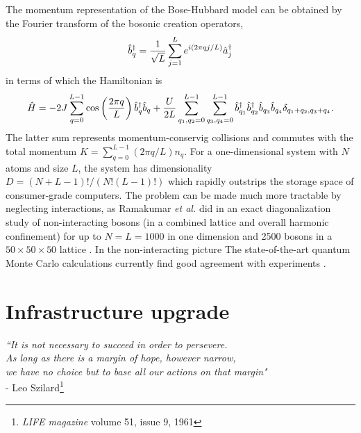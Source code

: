 	The momentum representation of the Bose-Hubbard model can be obtained by the Fourier transform\cite{Zhang10} of the bosonic creation operators,
	\begin{equation}
		\hat{b}^\dagger_q = \frac{1}{\sqrt{L}}\sum_{j=1}^{L}e^{i(2\pi q j/L)}\hat{a}^\dagger_j
	\end{equation}
	in terms of which the Hamiltonian is
	\begin{equation}
		\hat{H} = -2J\sum_{q=0}^{L-1}\cos\left(\frac{2\pi q}{L}\right)\hat{b}^\dagger_q\hat{b}_q + \frac{U}{2L}\sum_{q_1,q_2=0}^{L-1}\sum_{q_3,q_4=0}^{L-1}\hat{b}^\dagger_{q_1}\hat{b}^\dagger_{q_2}\hat{b}_{q_3}\hat{b}_{q_4}\delta_{q_1+q_2,q_3+q_4}.
	\end{equation}
	The latter sum represents momentum-conservig collisions and commutes with the total momentum $K = \sum_{q=0}^{L-1}(2\pi q/L)n_q$.
	For a one-dimensional system with $N$ atoms and size $L$, the system has dimensionality $D = (N+L-1)!/(N!(L-1)!)$ which rapidly outstrips the storage space of consumer-grade computers.
	The problem can be made much more tractable by neglecting interactions, as Ramakumar \emph{et al.} did in an exact diagonalization study of non-interacting bosons (in a combined lattice and overall harmonic confinement) for up to $N=L=1000$ in one dimension and 2500 bosons in a $50\times50\times50$ lattice \cite{Ramakumar07}.
	In the non-interacting picture 
	The state-of-the-art quantum Monte Carlo calculations currently find good agreement with experiments \cite{Cayla18,Herce21}.

\section{Infrastructure upgrade}

	\begin{flushright}
	\emph{``It is not necessary to succeed in order to persevere.\\
	As long as there is a margin of hope, however narrow, \\
	we have no choice but to base all our actions on that margin"}\\
	- Leo Szilard\footnote{\emph{LIFE magazine} volume 51, issue 9, 1961 }\\
	\end{flushright}


